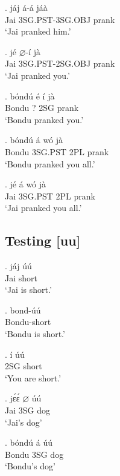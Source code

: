 \documentclass{assets/fieldnotes}
\begin{document}
\exg. jáj á-á jáà \\
Jai 3SG.PST-3SG.OBJ prank \\
`Jai pranked him.'

\exg. jé $\varnothing$-í jà \\
Jai 3SG.PST-2SG.OBJ prank \\
`Jai pranked you.'


\exg. bóndú é í jà \\
Bondu ? 2SG prank \\
`Bondu pranked you.'

\exg. bóndú á wó jà \\
Bondu 3SG.PST 2PL prank \\
`Bondu pranked you all.'


\exg. jé á wó jà \\
Jai 3SG.PST 2PL prank \\
`Jai pranked you all.'

\subsection{Testing [uu]}

\exg. jáj úú \\
Jai short \\
`Jai is short.'

\exg. bond-úú \\
Bondu-short \\
`Bondu is short.' \label{bondu_short}


\exg. í úú \\
2SG short \\
`You are short.'


\exg. jɛ́ɛ́ $\varnothing$ úú \\
Jai 3SG dog \\
`Jai's dog'


\exg. bóndú á úú \\
Bondu 3SG dog \\
`Bondu's dog'
\end{document}
